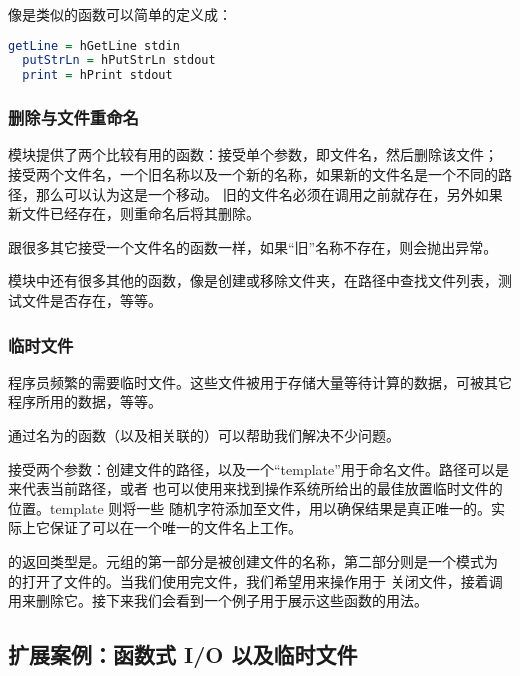 \documentclass[./main.tex]{subfiles}
\begin{document}
像是类似的函数可以简单的定义成：

\begin{lstlisting}[language=Haskell]
  getLine = hGetLine stdin
  putStrLn = hPutStrLn stdout
  print = hPrint stdout
\end{lstlisting}

\subsubsection*{删除与文件重命名}

模块提供了两个比较有用的函数：接受单个参数，即文件名，然后删除该文件；
接受两个文件名，一个旧名称以及一个新的名称，如果新的文件名是一个不同的路径，那么可以认为这是一个移动。
旧的文件名必须在调用之前就存在，另外如果新文件已经存在，则重命名后将其删除。

跟很多其它接受一个文件名的函数一样，如果“旧”名称不存在，则会抛出异常。

模块中还有很多其他的函数，像是创建或移除文件夹，在路径中查找文件列表，测试文件是否存在，等等。

\subsubsection*{临时文件}

程序员频繁的需要临时文件。这些文件被用于存储大量等待计算的数据，可被其它程序所用的数据，等等。

通过名为的函数（以及相关联的）可以帮助我们解决不少问题。

接受两个参数：创建文件的路径，以及一个“template”用于命名文件。路径可以是来代表当前路径，或者
也可以使用来找到操作系统所给出的最佳放置临时文件的位置。template 则将一些
随机字符添加至文件，用以确保结果是真正唯一的。实际上它保证了可以在一个唯一的文件名上工作。

的返回类型是。元组的第一部分是被创建文件的名称，第二部分则是一个模式为
的打开了文件的。当我们使用完文件，我们希望用来操作用于
关闭文件，接着调用来删除它。接下来我们会看到一个例子用于展示这些函数的用法。

\subsection*{扩展案例：函数式 I/O 以及临时文件}
\end{document}
